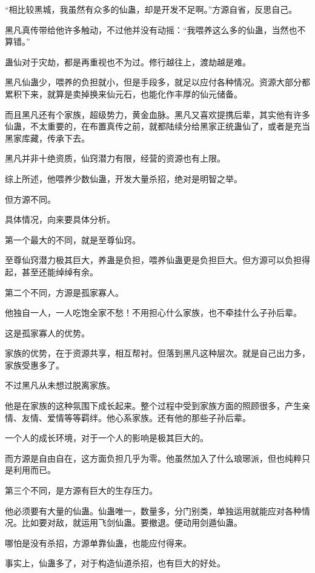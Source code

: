 
\begin{this_body}

“相比较黑城，我虽然有众多的仙蛊，却是开发不足啊。”方源自省，反思自己。

黑凡真传带给他许多触动，不过他并没有动摇：“我喂养这么多的仙蛊，当然也不算错。”

蛊仙对于灾劫，都是再重视也不为过。修行越往上，渡劫越是难。

黑凡仙蛊少，喂养的负担就小，但是手段多，就足以应付各种情况。资源大部分都累积下来，就算是卖掉换来仙元石，也能化作丰厚的仙元储备。

而且黑凡还有个家族，超级势力，黄金血脉。黑凡又喜欢提携后辈，其实他有许多仙蛊，不太重要的，在布置真传之前，就都陆续分给黑家正统蛊仙了，或者是充当黑家库藏，传承下去。

黑凡并非十绝资质，仙窍潜力有限，经营的资源也有上限。

综上所述，他喂养少数仙蛊，开发大量杀招，绝对是明智之举。

但方源不同。

具体情况，向来要具体分析。

第一个最大的不同，就是至尊仙窍。

至尊仙窍潜力极其巨大，养蛊是负担，喂养仙蛊更是负担巨大。但方源可以负担得起，甚至还能绰绰有余。

第二个不同，方源是孤家寡人。

他独自一人，一人吃饱全家不愁！不用担心什么家族，也不牵挂什么子孙后辈。

这是孤家寡人的优势。

家族的优势，在于资源共享，相互帮衬。但落到黑凡这种层次。就是自己出力多，家族受惠多了。

不过黑凡从未想过脱离家族。

他是在家族的这种氛围下成长起来。整个过程中受到家族方面的照顾很多，产生亲情、友情、爱情等等羁绊。他心系家族。还有他的那些子孙后辈。

一个人的成长环境，对于一个人的影响是极其巨大的。

而方源是自由自在，这方面负担几乎为零。他虽然加入了什么琅琊派，但也纯粹只是利用而已。

第三个不同，是方源有巨大的生存压力。

他必须要有大量的仙蛊。仙蛊唯一，数量多，分门别类，单独运用就能应对各种情况。比如要对敌，就运用飞剑仙蛊。要撤退。便动用剑遁仙蛊。

哪怕是没有杀招，方源单靠仙蛊，也能应付得来。

事实上，仙蛊多了，对于构造仙道杀招，也有巨大的好处。


\end{this_body}
